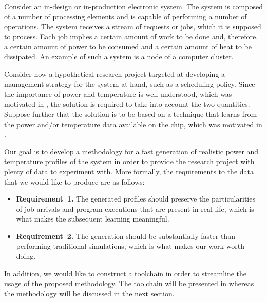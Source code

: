 Consider an in-design or in-production electronic system. The system is composed
of a number of processing elements and is capable of performing a number of
operations. The system receives a stream of requests or jobs, which it is
supposed to process. Each job implies a certain amount of work to be done and,
therefore, a certain amount of power to be consumed and a certain amount of heat
to be dissipated. An example of such a system is a node of a computer cluster.

Consider now a hypothetical research project targeted at developing a management
strategy for the system at hand, such as a scheduling policy. Since the
importance of power and temperature is well understood, which was motivated in
, the solution is required to take into account the two
quantities. Suppose further that the solution is to be based on a technique that
learns from the power and/or temperature data available on the chip, which was
motivated in .

Our goal is to develop a methodology for a fast generation of realistic power
and temperature profiles of the system in order to provide the research project
with plenty of data to experiment with. More formally, the requirements to the
data that we would like to produce are as follows:

\begin{itemize}
  \item {\bfseries Requirement~1.} The generated profiles should preserve the
  particularities of job arrivals and program executions that are present in
  real life, which is what makes the subsequent learning meaningful.

  \item {\bfseries Requirement~2.} The generation should be substantially faster
  than performing traditional simulations, which is what makes our work worth
  doing.
\end{itemize}

In addition, we would like to construct a toolchain in order to streamline the
usage of the proposed methodology. The toolchain will be presented in
 whereas the methodology will be discussed in the next section.

